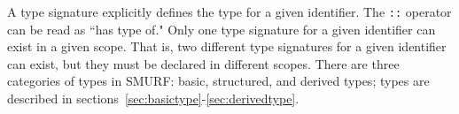 A type signature explicitly defines the type for a given identifier. The
\texttt{::} operator can be read as ``has type of." Only one type signature
for a given identifier can exist in a given scope. That is, two different
type signatures for a given identifier can exist, but they must be declared
in different scopes. There are three categories of types in SMURF: basic,  structured, and derived types; types are described in sections~\ref{sec:basictype}-\ref{sec:derivedtype}.



